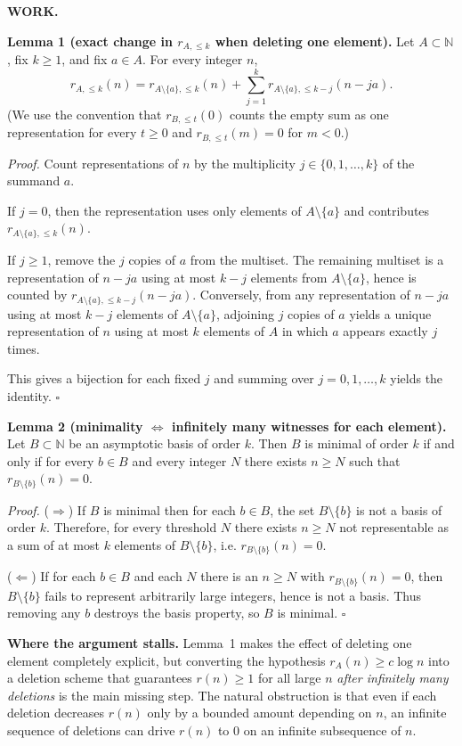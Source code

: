 \medskip
\noindent\textbf{WORK.}

\noindent\textbf{Lemma 1 (exact change in $r_{A,\le k}$ when deleting one element).}
Let $A\subset\mathbb N$, fix $k\ge 1$, and fix $a\in A$. For every integer $n$,
\[
 r_{A,\le k}(n)
 = r_{A\setminus\{a\},\le k}(n)
 + \sum_{j=1}^{k} r_{A\setminus\{a\},\le k-j}(n-ja).
\]
(We use the convention that $r_{B,\le t}(0)$ counts the empty sum as one representation for every $t\ge 0$ and $r_{B,\le t}(m)=0$ for $m<0$.)

\noindent\emph{Proof.}
Count representations of $n$ by the multiplicity $j\in\{0,1,\dots,k\}$ of the summand $a$.

If $j=0$, then the representation uses only elements of $A\setminus\{a\}$ and contributes $r_{A\setminus\{a\},\le k}(n)$.

If $j\ge 1$, remove the $j$ copies of $a$ from the multiset. The remaining multiset is a representation of $n-ja$ using at most $k-j$ elements from $A\setminus\{a\}$, hence is counted by $r_{A\setminus\{a\},\le k-j}(n-ja)$. Conversely, from any representation of $n-ja$ using at most $k-j$ elements of $A\setminus\{a\}$, adjoining $j$ copies of $a$ yields a unique representation of $n$ using at most $k$ elements of $A$ in which $a$ appears exactly $j$ times.

This gives a bijection for each fixed $j$ and summing over $j=0,1,\dots,k$ yields the identity.
\hfill$\square$

\medskip
\noindent\textbf{Lemma 2 (minimality $\Leftrightarrow$ infinitely many witnesses for each element).}
Let $B\subset\mathbb N$ be an asymptotic basis of order $k$. Then $B$ is minimal of order $k$ if and only if for every $b\in B$ and every integer $N$ there exists $n\ge N$ such that $r_{B\setminus\{b\}}(n)=0$.

\noindent\emph{Proof.}
($\Rightarrow$) If $B$ is minimal then for each $b\in B$, the set $B\setminus\{b\}$ is not a basis of order $k$. Therefore, for every threshold $N$ there exists $n\ge N$ not representable as a sum of at most $k$ elements of $B\setminus\{b\}$, i.e. $r_{B\setminus\{b\}}(n)=0$.

($\Leftarrow$) If for each $b\in B$ and each $N$ there is an $n\ge N$ with $r_{B\setminus\{b\}}(n)=0$, then $B\setminus\{b\}$ fails to represent arbitrarily large integers, hence is not a basis. Thus removing any $b$ destroys the basis property, so $B$ is minimal.
\hfill$\square$

\medskip
\noindent\textbf{Where the argument stalls.}
Lemma~1 makes the effect of deleting one element completely explicit, but converting the hypothesis
$r_A(n)\ge c\log n$ into a deletion scheme that guarantees $r(n)\ge 1$ for all large $n$ \emph{after infinitely many deletions} is the main missing step.
The natural obstruction is that even if each deletion decreases $r(n)$ only by a bounded amount depending on $n$, an infinite sequence of deletions can drive $r(n)$ to $0$ on an infinite subsequence of $n$.

